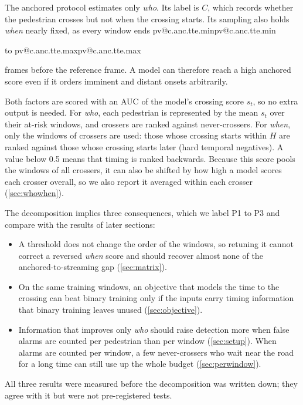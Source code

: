\documentclass[10pt,a4paper,twocolumn]{article}
\makeatletter
\newcommand{\V}[1]{\ifcsname pv@#1\endcsname\csname pv@#1\endcsname\else
  \PackageError{numbers}{Unknown number key: #1}{Run figures/make_tables.py}\fi}
\makeatother
\begin{document}
The anchored protocol estimates only \emph{who}. Its label is $C$, which records whether the pedestrian crosses but
not when the crossing starts. Its sampling also holds \emph{when} nearly
fixed, as every window ends \V{c.anc.tte.min} to \V{c.anc.tte.max} frames
before the reference frame. A model can therefore reach a high anchored score
even if it orders imminent and distant onsets arbitrarily.

Both factors are scored with an AUC of the model's crossing score $s_t$, so no
extra output is needed. For \emph{who}, each pedestrian is represented by the
mean $s_t$ over their at-risk windows, and crossers are ranked against
never-crossers. For \emph{when}, only the windows of crossers are used: those
whose crossing starts within $H$ are ranked against those whose crossing
starts later (hard temporal negatives). A value below 0.5 means that timing
is ranked backwards.
Because this score pools the windows of all crossers, it can also be shifted
by how high a model scores each crosser overall, so we also report it
averaged within each crosser (\cref{sec:whowhen}).

The decomposition implies three consequences, which we label P1 to P3 and
compare with the results of later sections:
\begin{itemize}\setlength{\itemsep}{0pt}
  \item[\textbf{P1}] A threshold does not change the order of
  the windows, so retuning it cannot correct a reversed \emph{when} score and
  should recover almost none of the anchored-to-streaming gap (\cref{sec:matrix}).
  \item[\textbf{P2}] On the same training windows, an objective that models the time to the
  crossing can beat binary training only if the inputs carry timing information
  that binary training leaves unused (\cref{sec:objective}).
  \item[\textbf{P3}] Information
  that improves only \emph{who} should raise detection more when false alarms
  are counted per pedestrian than per window (\cref{sec:setup}). When alarms are
  counted per window, a few never-crossers who wait near the road for a long
  time can still use up the whole budget (\cref{sec:perwindow}).
\end{itemize}
All three results were measured before the decomposition was written down;
they agree with it but were not pre-registered tests.
\end{document}
